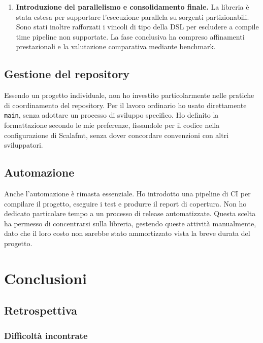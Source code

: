\documentclass[a4paper,11pt]{report}
\theoremstyle{definition}
\begin{document}
\begin{enumerate}
  \item \textbf{Introduzione del parallelismo e consolidamento finale.}
    La libreria è stata estesa per supportare l'esecuzione parallela su sorgenti partizionabili. Sono stati inoltre rafforzati i vincoli di tipo della DSL per escludere a compile time pipeline non supportate. La fase conclusiva ha compreso affinamenti prestazionali e la valutazione comparativa mediante benchmark.
\end{enumerate}

\section{Gestione del repository}
\label{sec:gestione-repository}

Essendo un progetto individuale, non ho investito particolarmente nelle pratiche di coordinamento del repository. Per il lavoro ordinario ho usato direttamente \texttt{main}, senza adottare un processo di sviluppo specifico. Ho definito la formattazione secondo le mie preferenze, fissandole per il codice nella configurazione di Scalafmt, senza dover concordare convenzioni con altri sviluppatori.

\section{Automazione}
\label{sec:automazione}

Anche l'automazione è rimasta essenziale. Ho introdotto una pipeline di CI per compilare il progetto, eseguire i test e produrre il report di copertura. Non ho dedicato particolare tempo a un processo di release automatizzate. Questa scelta ha permesso di concentrarsi sulla libreria, gestendo queste attività manualmente, dato che il loro costo non sarebbe stato ammortizzato vista la breve durata del progetto.

\chapter{Conclusioni}
\label{chap:conclusioni}

\section{Retrospettiva}
\label{sec:retrospettiva}

\subsection{Difficoltà incontrate}
\label{sec:difficolta-incontrate}
\end{document}
